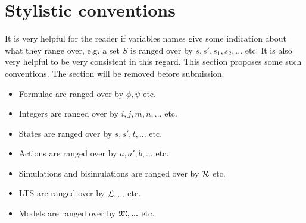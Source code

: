 \section{Stylistic conventions}

It is very helpful for the reader if variables names give some
indication about what they range over, e.g. a set $S$ is ranged over
by $s, s', s_1, s_2, ...$ etc.  It is also very helpful to be very
consistent in this regard.  This section proposes some such
conventions. The section will be removed before submission.

\begin{itemize}

\item Formulae  are ranged over by $\phi, \psi$ etc.
\item Integers are ranged over by $i, j, m, n, ...$ etc.
\item States are ranged over by $s, s', t, ...$ etc.
\item Actions are ranged over by $a, a', b, ...$ etc.
\item Simulations and bisimulations are ranged over by $\mathcal{R}$ etc.
\item LTS are ranged over by $\mathcal{L}, ...$ etc.
\item Models are ranged over by $\mathfrak{M}, ...$ etc.

\end{itemize}
